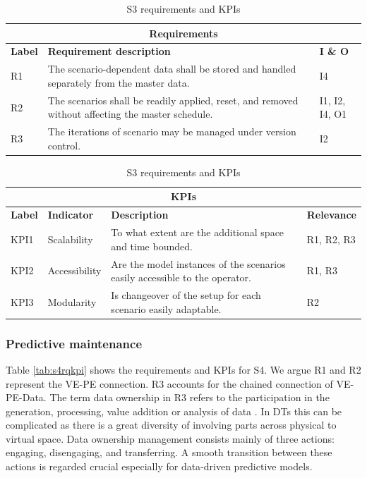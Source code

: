 \documentclass[journal,onecolumn]{IEEEtran} %
\begin{document}
\begin{table}[hbt!]
\centering
\begin{tabularx}{0.8\textwidth}{|p{1cm}|X|p{1.5cm}|}
\hline
\multicolumn{3}{|c|}{\textbf{Requirements}} \\
\hline
\textbf{Label} & \textbf{Requirement description} & \textbf{I \& O} \\ 
\hline            
R1 & The scenario-dependent data shall be stored and handled separately from the master data. & I4 \\ 
\hline
R2 & The scenarios shall be readily applied, reset, and removed without affecting the master schedule. & I1, I2, I4, O1 \\ 
\hline
R3 & The iterations of scenario may be managed under version control. & I2 \\ 
\hline \hline
\end{tabularx}
\begin{tabularx}{0.8\textwidth}{|p{1cm}|p{2cm}|X|p{1.5cm}|}
\multicolumn{4}{|c|}{\textbf{KPIs}} \\ 
\hline
\textbf{Label} & \textbf{Indicator} & \textbf{Description} & \textbf{Relevance} \\ 
\hline
KPI1 & Scalability & To what extent are the additional space and time bounded. & R1, R2, R3 \\ 
\hline
KPI2 & Accessibility & Are the model instances of the scenarios easily accessible to the operator. & R1, R3 \\ 
\hline
KPI3 & Modularity & Is changeover of the setup for each scenario easily adaptable. & R2 \\
\hline
\end{tabularx}
\caption{S3 requirements and KPIs}
\label{tab:s3rqkpi}
\end{table}

\subsubsection{Predictive maintenance}
Table \ref{tab:s4rqkpi} shows the requirements and KPIs for S4. We argue R1 and R2 represent the VE-PE connection. R3 accounts for the chained connection of VE-PE-Data. The term data ownership in R3 refers to the participation in the generation, processing, value addition or analysis of data \cite{Rasheed2020}. In DTs this can be complicated as there is a great diversity of involving parts across physical to virtual space. Data ownership management consists mainly of three actions: engaging, disengaging, and transferring. A smooth transition between these actions is regarded crucial especially for data-driven predictive models.
\end{document}
